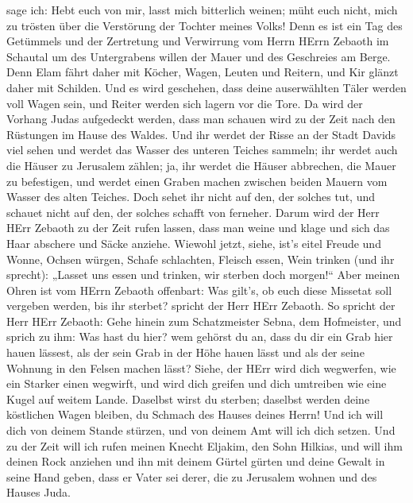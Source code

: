 sage ich: Hebt euch von mir, lasst mich bitterlich weinen; müht euch
nicht, mich zu trösten über die Verstörung der Tochter meines Volks!
 Denn es ist ein Tag des Getümmels und der Zertretung und
Verwirrung vom Herrn HErrn Zebaoth im Schautal um des Untergrabens
willen der Mauer und des Geschreies am Berge.  Denn Elam
fährt daher mit Köcher, Wagen, Leuten und Reitern, und Kir glänzt daher
mit Schilden.  Und es wird geschehen, dass deine
auserwählten Täler werden voll Wagen sein, und Reiter werden sich lagern
vor die Tore.  Da wird der Vorhang Judas aufgedeckt werden,
dass man schauen wird zu der Zeit nach den Rüstungen im Hause des
Waldes.  Und ihr werdet der Risse an der Stadt Davids viel
sehen und werdet das Wasser des unteren Teiches sammeln; 
ihr werdet auch die Häuser zu Jerusalem zählen; ja, ihr werdet die
Häuser abbrechen, die Mauer zu befestigen,  und werdet
einen Graben machen zwischen beiden Mauern vom Wasser des alten Teiches.
Doch sehet ihr nicht auf den, der solches tut, und schauet nicht auf
den, der solches schafft von ferneher.  Darum wird der Herr
HErr Zebaoth zu der Zeit rufen lassen, dass man weine und klage und sich
das Haar abschere und Säcke anziehe.  Wiewohl jetzt, siehe,
ist's eitel Freude und Wonne, Ochsen würgen, Schafe schlachten, Fleisch
essen, Wein trinken (und ihr sprecht): „Lasset uns essen und trinken,
wir sterben doch morgen!{}``  Aber meinen Ohren ist vom
HErrn Zebaoth offenbart: Was gilt's, ob euch diese Missetat soll
vergeben werden, bis ihr sterbet? spricht der Herr HErr Zebaoth.
 So spricht der Herr HErr Zebaoth: Gehe hinein zum
Schatzmeister Sebna, dem Hofmeister, und sprich zu ihm: 
Was hast du hier? wem gehörst du an, dass du dir ein Grab hier hauen
lässest, als der sein Grab in der Höhe hauen lässt und als der seine
Wohnung in den Felsen machen lässt?  Siehe, der HErr wird
dich wegwerfen, wie ein Starker einen wegwirft, und wird dich greifen
 und dich umtreiben wie eine Kugel auf weitem Lande.
Daselbst wirst du sterben; daselbst werden deine köstlichen Wagen
bleiben, du Schmach des Hauses deines Herrn!  Und ich will
dich von deinem Stande stürzen, und von deinem Amt will ich dich setzen.
 Und zu der Zeit will ich rufen meinen Knecht Eljakim, den
Sohn Hilkias,  und will ihm deinen Rock anziehen und ihn
mit deinem Gürtel gürten und deine Gewalt in seine Hand geben, dass er
Vater sei derer, die zu Jerusalem wohnen und des Hauses Juda.
